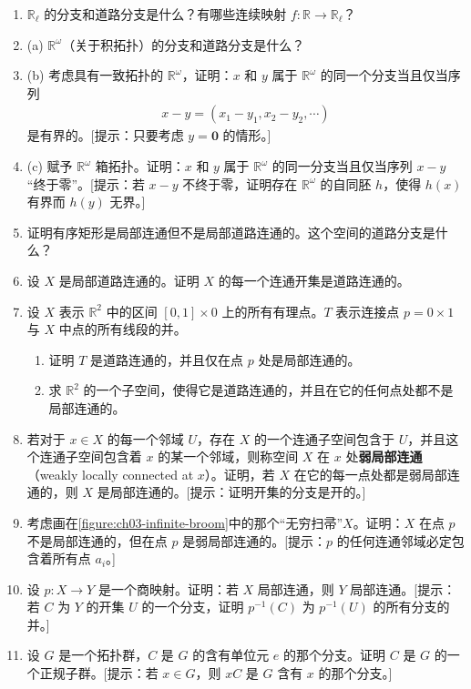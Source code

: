 \begin{enumerate}
\item $\mathbb{R}_{\ell}$ 的分支和道路分支是什么？有哪些连续映射 $f\colon\mathbb{R}\to\mathbb{R}_{\ell}$？
\item (a) $\mathbb{R}^{\omega}$（关于积拓扑）的分支和道路分支是什么？
\item (b) 考虑具有一致拓扑的 $\mathbb{R}^{\omega}$，证明：$x$ 和 $y$ 属于 $\mathbb{R}^{\omega}$ 的同一个分支当且仅当序列
\begin{align*}
x-y=(x_{1}-y_{1},x_{2}-y_{2},\cdots)
\end{align*}
是有界的。[提示：只要考虑 $y=\boldsymbol{0}$ 的情形。]
\item (c) 赋予 $\mathbb{R}^{\omega}$ 箱拓扑。证明：$x$ 和 $y$ 属于 $\mathbb{R}^{\omega}$ 的同一分支当且仅当序列 $x-y$``终于零''。[提示：若 $x-y$ 不终于零，证明存在 $\mathbb{R}^{\omega}$ 的自同胚 $h$，使得 $h(x)$ 有界而 $h(y)$ 无界。]
\item 证明有序矩形是局部连通但不是局部道路连通的。这个空间的道路分支是什么？
\item 设 $X$ 是局部道路连通的。证明 $X$ 的每一个连通开集是道路连通的。
\item 设 $X$ 表示 $\mathbb{R}^{2}$ 中的区间 $[0,1]\times 0$ 上的所有有理点。$T$ 表示连接点 $p=0\times 1$ 与 $X$ 中点的所有线段的并。
\begin{enumerate}
\item 证明 $T$ 是道路连通的，并且仅在点 $p$ 处是局部连通的。
\item 求 $\mathbb{R}^{2}$ 的一个子空间，使得它是道路连通的，并且在它的任何点处都不是局部连通的。
\end{enumerate}
\item 若对于 $x\in X$ 的每一个邻域 $U$，存在 $X$ 的一个连通子空间包含于 $U$，并且这个连通子空间包含着 $x$ 的某一个邻域，则称空间 $X$ 在 $x$ 处\textbf{弱局部连通}（weakly locally connected at $x$）。证明，若 $X$ 在它的每一点处都是弱局部连通的，则 $X$ 是局部连通的。[提示：证明开集的分支是开的。]
\item 考虑画在\cref{figure:ch03-infinite-broom}中的那个``无穷扫帚''$X$。证明：$X$ 在点 $p$ 不是局部连通的，但在点 $p$ 是弱局部连通的。[提示：$p$ 的任何连通邻域必定包含着所有点 $a_{i}$。]
\item 设 $p\colon X\to Y$ 是一个商映射。证明：若 $X$ 局部连通，则 $Y$ 局部连通。[提示：若 $C$ 为 $Y$ 的开集 $U$ 的一个分支，证明 $p^{-1}(C)$ 为 $p^{-1}(U)$ 的所有分支的并。]
\item 设 $G$ 是一个拓扑群，$C$ 是 $G$ 的含有单位元 $e$ 的那个分支。证明 $C$ 是 $G$ 的一个正规子群。[提示：若 $x\in G$，则 $xC$ 是 $G$ 含有 $x$ 的那个分支。]

\end{enumerate}
